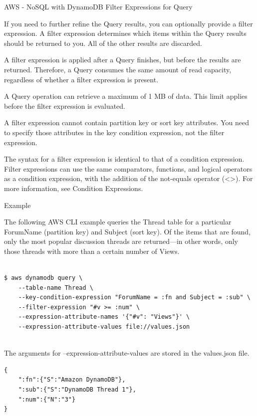 \begin{frame}{AWS - NoSQL with DynamoDB}
Filter Expressions for Query

If you need to further refine the Query results, you can optionally provide a filter expression. A filter expression determines which items within the Query results should be returned to you. All of the other results are discarded.

A filter expression is applied after a Query finishes, but before the results are returned. Therefore, a Query consumes the same amount of read capacity, regardless of whether a filter expression is present.

A Query operation can retrieve a maximum of 1 MB of data. This limit applies before the filter expression is evaluated.

A filter expression cannot contain partition key or sort key attributes. You need to specify those attributes in the key condition expression, not the filter expression.

The syntax for a filter expression is identical to that of a condition expression. Filter expressions can use the same comparators, functions, and logical operators as a condition expression, with the addition of the not-equals operator (<>). For more information, see Condition Expressions.

Example

The following AWS CLI example queries the Thread table for a particular ForumName (partition key) and Subject (sort key). Of the items that are found, only the most popular discussion threads are returned—in other words, only those threads with more than a certain number of Views. 

\begin{lstlisting}

$ aws dynamodb query \
    --table-name Thread \
    --key-condition-expression "ForumName = :fn and Subject = :sub" \
    --filter-expression "#v >= :num" \
    --expression-attribute-names '{"#v": "Views"}' \
    --expression-attribute-values file://values.json
 
\end{lstlisting}
The arguments for --expression-attribute-values are stored in the values.json file. 
\begin{lstlisting}
{
    ":fn":{"S":"Amazon DynamoDB"},
    ":sub":{"S":"DynamoDB Thread 1"},
    ":num":{"N":"3"}
}
\end{lstlisting}

\end{frame}

